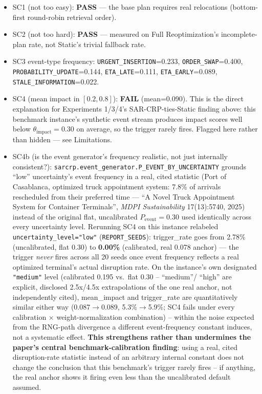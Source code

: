 \documentclass[11pt]{article}
\begin{document}
\begin{itemize}
  \item SC1 (not too easy): \textbf{PASS} --- the base plan requires real relocations (bottom-first round-robin retrieval order).
  \item SC2 (not too hard): \textbf{PASS} --- measured on Full Reoptimization's incomplete-plan rate, not Static's trivial fallback rate.
  \item SC3 event-type frequency: \texttt{URGENT\_INSERTION}=0.233, \texttt{ORDER\_SWAP}=0.400, \texttt{PROBABILITY\_UPDATE}=0.144, \texttt{ETA\_LATE}=0.111, \texttt{ETA\_EARLY}=0.089, \texttt{STALE\_INFORMATION}=0.022.
  \item SC4 (mean impact in $[0.2, 0.8]$): \textbf{FAIL} (mean=0.090). This is the direct explanation for Experiments 1/3/4's SAR-CRP-ties-Static finding above: this benchmark instance's synthetic event stream produces impact scores well below $\theta_{\text{impact}}=0.30$ on average, so the trigger rarely fires. Flagged here rather than hidden --- see Limitations.
  \item SC4b (is the event generator's frequency realistic, not just internally
    consistent?): \texttt{sarcrp.event\_generator.P\_EVENT\_BY\_UNCERTAINTY}
    grounds ``low'' uncertainty's event frequency in a real, cited
    statistic (Port of Casablanca, optimized truck appointment system:
    7.8\% of arrivals rescheduled from their preferred time --- ``A Novel
    Truck Appointment System for Container Terminals'', \emph{MDPI
    Sustainability} 17(13):5740, 2025) instead of the original flat,
    uncalibrated $P_{\text{event}}=0.30$ used identically across every
    uncertainty level. Rerunning SC4 on this instance relabeled
    \texttt{uncertainty\_level="low"} (\texttt{REPORT\_SEEDS}): trigger\_rate
    goes from 2.78\% (uncalibrated, flat 0.30) to \textbf{0.00\%}
    (calibrated, real 0.078 anchor) --- the trigger \emph{never} fires
    across all 20 seeds once event frequency reflects a real optimized
    terminal's actual disruption rate. On the instance's own designated
    \texttt{"medium"} level (calibrated 0.195 vs.\ flat 0.30 -- ``medium''/
    ``high'' are explicit, disclosed 2.5x/4.5x extrapolations of the one
    real anchor, not independently cited), mean\_impact and trigger\_rate
    are quantitatively similar either way (0.087$\to$0.089,
    5.3\%$\to$5.9\%; SC4 fails under every calibration $\times$
    weight-normalization combination) -- within the noise expected from
    the RNG-path divergence a different event-frequency constant induces,
    not a systematic effect. \textbf{This strengthens rather than
    undermines the paper's central benchmark-calibration finding}: using a
    real, cited disruption-rate statistic instead of an arbitrary internal
    constant does not change the conclusion that this benchmark's trigger
    rarely fires -- if anything, the real anchor shows it firing even less
    than the uncalibrated default assumed.
\end{itemize}
\end{document}
